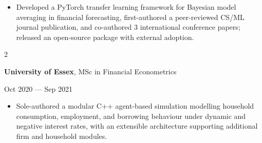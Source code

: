\documentclass[6pt, letterpaper]{article}
\newenvironment{highlights}{
    \begin{itemize}[
        topsep=0.02 cm,
        parsep=0.02 cm,
        partopsep=0pt,
        itemsep=0pt,
        leftmargin=0 cm + 8pt
    ]
}{
    \end{itemize}
} %
\newenvironment{twocolentry}[2][]{
    \onecolentry
    \def\secondColumn{#2}
    \setcolumnwidth{\fill, 4.5 cm}
    \begin{paracol}{2}
}{
    \switchcolumn \raggedleft \secondColumn
    \end{paracol}
    \endonecolentry
} %
\begin{document}
            \begin{highlights}

            \item Developed a PyTorch transfer learning framework for Bayesian model averaging in financial forecasting, first-authored a peer-reviewed CS/ML journal publication, and co-authored 3 international conference papers; released an open-source package with external adoption.

            \end{highlights}

            \begin{twocolentry}{
                Oct 2020 --- Sep 2021
            }
            \textbf{University of Essex}, MSc in Financial Econometrics
            \end{twocolentry}

            \begin{highlights}

            \item Sole-authored a modular C++ agent-based simulation modelling household consumption, employment, and borrowing behaviour under dynamic and negative interest rates, with an extensible architecture supporting additional firm and household modules.

            \end{highlights}
\end{document}

